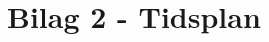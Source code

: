 \documentclass[main.tex]{subfiles}
\begin{document}
\chapter*{Bilag 2 - Tidsplan}
\label{tidsplan}




\end{document}
